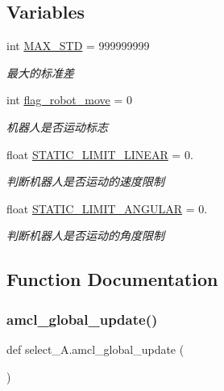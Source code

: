 \subsection*{Variables}
\begin{DoxyCompactItemize}
\item 
int \hyperlink{namespaceselect___a_a328b1190c118d73685f2af988b949f28}{M\+A\+X\+\_\+\+S\+TD} = 999999999
\begin{DoxyCompactList}\small\item\em 最大的标准差 \end{DoxyCompactList}\item 
int \hyperlink{namespaceselect___a_af5f7c62998c1bd067d53a259ca8a256c}{flag\+\_\+robot\+\_\+move} = 0
\begin{DoxyCompactList}\small\item\em 机器人是否运动标志 \end{DoxyCompactList}\item 
float \hyperlink{namespaceselect___a_aea920a3b4aec2b93dda3da61d4d50279}{S\+T\+A\+T\+I\+C\+\_\+\+L\+I\+M\+I\+T\+\_\+\+L\+I\+N\+E\+AR} = 0.
\begin{DoxyCompactList}\small\item\em 判断机器人是否运动的速度限制 \end{DoxyCompactList}\item 
float \hyperlink{namespaceselect___a_a6872b0a6ca82d7af4cc88a732206a9e7}{S\+T\+A\+T\+I\+C\+\_\+\+L\+I\+M\+I\+T\+\_\+\+A\+N\+G\+U\+L\+AR} = 0.
\begin{DoxyCompactList}\small\item\em 判断机器人是否运动的角度限制 \end{DoxyCompactList}\end{DoxyCompactItemize}


\subsection{Function Documentation}
\mbox{\label{namespaceselect___a_a375138794460ec68c792c8cddb7870e4}} 
\subsubsection{\texorpdfstring{amcl\+\_\+global\+\_\+update()}{amcl\_global\_update()}}
{\footnotesize\ttfamily def select\+\_\+\+A.\+amcl\+\_\+global\+\_\+update (\begin{DoxyParamCaption}{ }\end{DoxyParamCaption})}



